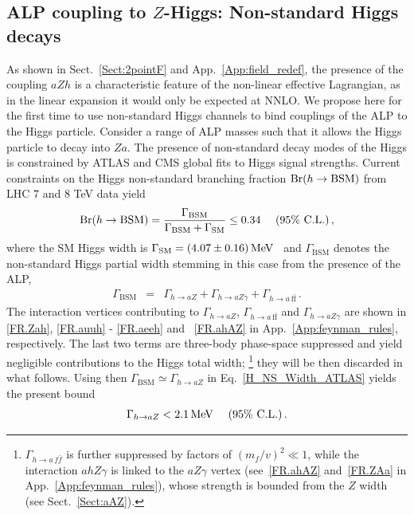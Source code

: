 \documentclass[11pt]{article}
\DeclareMathOperator{\Br}{Br}
\newcommand{\cl}{\%\,\,  \text{C.L.}}
\renewcommand{\to}{\rightarrow}
\renewcommand{\[}{\begin{equation}}
\renewcommand{\]}{\end{equation}}
\newcommand{\tpdf}{\texorpdfstring}
\begin{document}
\subsection{ALP coupling to \tpdf{$Z$}{Z}-Higgs: Non-standard Higgs decays }
\label{Sect:hZax_Br}
As shown in Sect.~\ref{Sect:2pointF} and App.~\ref{App:field_redef}, the presence of the coupling $aZh$ is a characteristic feature of 
the non-linear effective Lagrangian, as in the linear expansion it would only be expected at NNLO. 
We propose here for the first time to use non-standard Higgs channels to bind couplings of the ALP to the Higgs particle.
Consider a range of ALP masses such that it allows
the Higgs particle to decay into $Za$.
The presence of non-standard decay modes of the Higgs is constrained by ATLAS and CMS global 
fits to Higgs signal strengths. Current constraints on the Higgs non-standard branching fraction  $\Br (h\to {\rm BSM})$  from 
LHC $7$ and $8$ TeV data yield~\cite{Khachatryan:2016vau}
\begin{equation}
\Br (h\to {\rm BSM}) = 
\frac{\Gamma_\text{BSM}}{\Gamma_\text{BSM}+\Gamma_\text{SM}} \leq 0.34 \quad\,\, 
(95\cl)\,,
\label{H_NS_Width_ATLAS}
\end{equation}
%
where the SM Higgs width is $\Gamma_\text{SM} = \unit[(4.07\pm 0.16)]{MeV}$~\cite{Denner:2011mq} and 
$\Gamma_\text{BSM}$ denotes 
the non-standard Higgs partial width stemming in this case from the presence of the ALP, 
%
\begin{eqnarray} \label{H_NS}
 \Gamma_\text{BSM} & = & \Gamma_{h \to aZ} + \Gamma_{h \to aZ\gamma} + \Gamma_{h \to a\,\text{f}\bar{\text{f}}}\,. 
 \end{eqnarray}
%
The interaction vertices contributing to $\Gamma_{h \to aZ}$, $\Gamma_{h \to a\,\text{f}\bar{\text{f}}}$  and $\Gamma_{h \to aZ\gamma}$ are shown in \ref{FR.Zah}, 
 \ref{FR.auuh} - \ref{FR.aeeh} and ~\ref{FR.ahAZ} in App.~\ref{App:feynman_rules}, respectively.  The last two terms are 
three-body phase-space suppressed and yield negligible contributions to the Higgs total width; \footnote{ $\Gamma_{h \to a\,f\bar{f}}$ is 
further suppressed by factors of 
$(m_f/v)^2 \ll 1$, while the interaction $ahZ\gamma$ is linked to the  $aZ\gamma$ vertex (see~\ref{FR.ahAZ} and~\ref{FR.ZAa} in App.~\ref{App:feynman_rules}), 
whose strength is bounded from the $Z$ width (see Sect.~\ref{Sect:aAZ}).}
they will be then discarded in what follows. Using then $\Gamma_\text{BSM} \simeq \Gamma_{h \to aZ}$ in Eq.~\eqref{H_NS_Width_ATLAS}
yields the present bound
%
\begin{equation}\label{HtoZaWD_bound}
 \Gamma_{h \to aZ}  < \unit[2.1]{MeV} \quad\,\, 
(95\cl)\,.
\end{equation}
\end{document}
